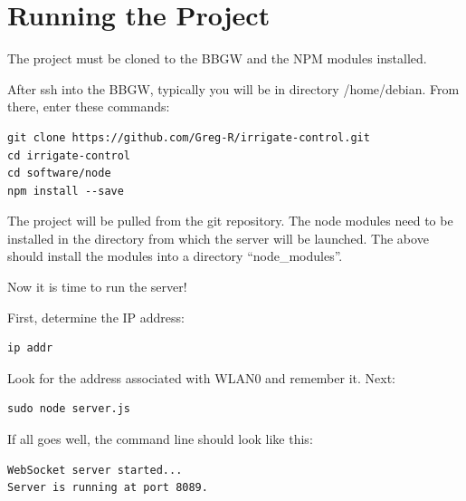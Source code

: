 %
%
%

\chapter{Running the Project}

The project must be cloned to the BBGW and the NPM modules installed.

After ssh into the BBGW, typically you will be in directory /home/debian.
From there, enter these commands:

\begin{verbatim}
git clone https://github.com/Greg-R/irrigate-control.git
cd irrigate-control
cd software/node
npm install --save
\end{verbatim}

The project will be pulled from the git repository.  The node modules need to 
be installed in the directory from which the server will be launched.
The above should install the modules into a directory ``node\_modules''.

Now it is time to run the server!

First, determine the IP address:

\begin{verbatim}
ip addr
\end{verbatim}

Look for the address associated with WLAN0 and remember it.  Next:

\begin{verbatim}
sudo node server.js
\end{verbatim}

If all goes well, the command line should look like this:

\begin{verbatim}
WebSocket server started...
Server is running at port 8089.
\end{verbatim}

